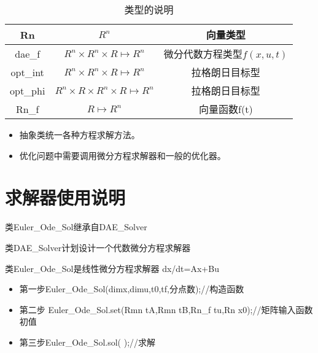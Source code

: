\documentclass[a4]{ctexart}
\begin{document}
\begin{table}[h]
\centering  %
\caption{类型的说明}  %
\label{table1}  %
\begin{tabular}{|c|c|c|} 
\hline
Rn     &    $R^n$     &           向量类型  \\
\hline
dae\_f &   $R^n\times R^n\times R \mapsto R^n$ & 微分代数方程类型$f(x,u,t)$\\
 \hline
  opt\_int & $R^n\times R^n\times R\mapsto R^n$  & 拉格朗日目标型\\
 \hline
 opt\_phi   & $ R^n\times R\times R^n\times R\mapsto R^n$  & 拉格朗日目标型\\
 \hline
 Rn\_f   & $ R\mapsto R^n$  & 向量函数f(t)\\
 \hline
 
\end{tabular}
\end{table}



\begin{itemize}
\item 抽象类统一各种方程求解方法。
\item 优化问题中需要调用微分方程求解器和一般的优化器。
\end{itemize}







\section{求解器使用说明}
类Euler\_Ode\_Sol继承自DAE\_Solver

类DAE\_Solver计划设计一个代数微分方程求解器

类Euler\_Ode\_Sol是线性微分方程求解器
dx/dt=Ax+Bu

\begin{itemize}
\item 第一步Euler\_Ode\_Sol(dimx,dimu,t0,tf,分点数);//构造函数
\item 第二步 Euler\_Ode\_Sol.set(Rmn tA,Rmn tB,Rn\_f tu,Rn x0);//矩阵输入函数初值
\item 第三步Euler\_Ode\_Sol.sol( );//求解
\end{itemize}
\end{document}
